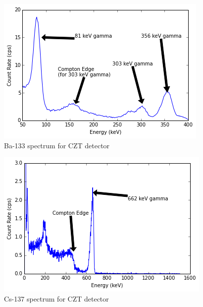 \documentclass[12pt]{article}
\begin{document}
\begin{center}
\begin{figure}
	\includegraphics{czt_ba133}
	\caption{Ba-133 spectrum for CZT detector}
	\label{fig:ba133czt}
\end{figure}
\end{center}

\begin{center}
\begin{figure}
	\includegraphics{czt_cs137}
	\caption{Cs-137 spectrum for CZT detector}
	\label{fig:cs137czt}
\end{figure}
\end{center}
\end{document}
